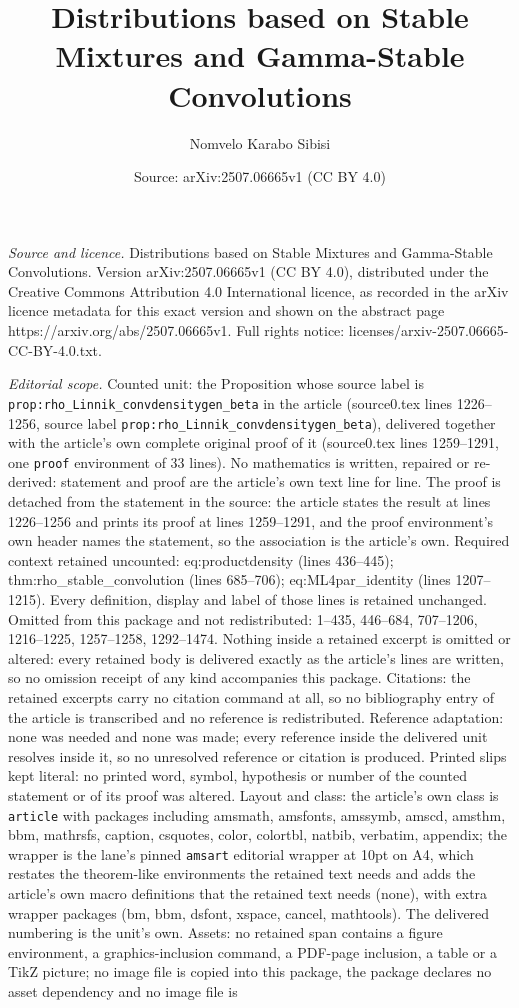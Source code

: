 \documentclass[10pt,a4paper]{amsart}
\title[Distributions based on Stable Mixtures and Gamma-Stable Conv]{Distributions based on Stable Mixtures and Gamma-Stable Convolutions}
\author{Nomvelo Karabo Sibisi}
\date{Source: arXiv:2507.06665v1 (CC BY 4.0)}
\begin{document}
\maketitle

\noindent\emph{Source and licence.} Distributions based on Stable Mixtures and Gamma-Stable Convolutions. Version arXiv:2507.06665v1 (CC BY 4.0), distributed under the Creative Commons Attribution 4.0 International licence, as recorded in the arXiv licence metadata for this exact version and shown on the abstract page https://arxiv.org/abs/2507.06665v1. Full rights notice: licenses/arxiv-2507.06665-CC-BY-4.0.txt.\par\smallskip

\noindent\textit{Editorial scope.} Counted unit: the Proposition whose source label is \texttt{prop:rho\_Linnik\_convdensitygen\_beta} in the article (source0.tex lines 1226--1256, source label \texttt{prop:rho\_Linnik\_convdensitygen\_beta}), delivered together with the article's own complete original proof of it (source0.tex lines 1259--1291, one \texttt{proof} environment of 33 lines). No mathematics is written, repaired or re-derived: statement and proof are the article's own text line for line. The proof is detached from the statement in the source: the article states the result at lines 1226--1256 and prints its proof at lines 1259--1291, and the proof environment's own header names the statement, so the association is the article's own. Required context retained uncounted: eq:productdensity (lines 436--445); thm:rho\_stable\_convolution (lines 685--706); eq:ML4par\_identity (lines 1207--1215). Every definition, display and label of those lines is retained unchanged. Omitted from this package and not redistributed: 1--435, 446--684, 707--1206, 1216--1225, 1257--1258, 1292--1474. Nothing inside a retained excerpt is omitted or altered: every retained body is delivered exactly as the article's lines are written, so no omission receipt of any kind accompanies this package. Citations: the retained excerpts carry no citation command at all, so no bibliography entry of the article is transcribed and no reference is redistributed. Reference adaptation: none was needed and none was made; every reference inside the delivered unit resolves inside it, so no unresolved reference or citation is produced. Printed slips kept literal: no printed word, symbol, hypothesis or number of the counted statement or of its proof was altered. Layout and class: the article's own class is \texttt{article} with packages including amsmath, amsfonts, amssymb, amscd, amsthm, bbm, mathrsfs, caption, csquotes, color, colortbl, natbib, verbatim, appendix; the wrapper is the lane's pinned \texttt{amsart} editorial wrapper at 10pt on A4, which restates the theorem-like environments the retained text needs and adds the article's own macro definitions that the retained text needs (none), with extra wrapper packages (bm, bbm, dsfont, xspace, cancel, mathtools). The delivered numbering is the unit's own. Assets: no retained span contains a figure environment, a graphics-inclusion command, a PDF-page inclusion, a table or a TikZ picture; no image file is copied into this package, the package declares no asset dependency and no image file is 
\end{document}

